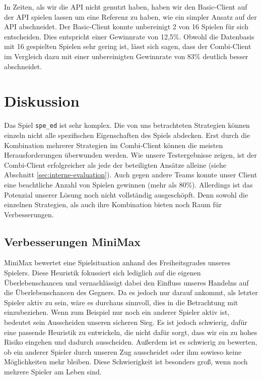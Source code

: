 \documentclass[12pt,a4paper]{article}
\begin{document}
In Zeiten, als wir die API nicht genutzt haben, haben wir den Basic-Client auf der API spielen lassen um eine Referenz zu haben, wie ein simpler Ansatz auf der API abschneidet. Der Basic-Client konnte unbereinigt 2 von 16 Spielen für sich entscheiden. Dies entspricht einer Gewinnrate von 12,5\%. Obwohl die Datenbasis mit 16 gespielten Spielen sehr gering ist, lässt sich sagen, dass der Combi-Client im Vergleich dazu mit einer unbereinigten Gewinnrate von 83\% deutlich besser abschneidet.


\section{Diskussion}
Das Spiel \texttt{spe\_ed} ist sehr komplex. Die von uns betrachteten Strategien können einzeln nicht alle spezifischen Eigenschaften des Spiels abdecken. Erst durch die Kombination mehrerer Strategien im Combi-Client können die meisten Herausforderungen überwunden werden. Wie unsere Testergebnisse zeigen, ist der Combi-Client erfolgreicher als jede der beteiligten Ansätze alleine (siehe Abschnitt \ref{sec:interne-evaluation}). Auch gegen andere Teams konnte unser Client eine beachtliche Anzahl von Spielen gewinnen (mehr als 80\%). Allerdings ist das Potenzial unserer Lösung noch nicht vollständig ausgeschöpft. Denn sowohl die einzelnen Strategien, als auch ihre Kombination bieten noch Raum für Verbesserungen.

\subsection{Verbesserungen MiniMax}
MiniMax bewertet eine Spielsituation anhand des Freiheitsgrades unseres Spielers. Diese Heuristik fokussiert sich lediglich auf die eigenen Überlebenschancen und vernachlässigt dabei den Einfluss unseres Handelns auf die Überlebenschancen des Gegners. Da es jedoch nur darauf ankommt, als letzter Spieler aktiv zu sein, wäre es durchaus sinnvoll, dies in die Betrachtung mit einzubeziehen. Wenn zum Beispiel nur noch ein anderer Spieler aktiv ist, bedeutet sein Ausscheiden unseren sicheren Sieg. Es ist jedoch schwierig, dafür eine passende Heuristik zu entwickeln, die nicht dafür sorgt, dass wir ein zu hohes Risiko eingehen und dadurch ausscheiden. Außerdem ist es schwierig zu bewerten, ob ein anderer Spieler durch unseren Zug ausscheidet oder ihm sowieso keine Möglichkeiten mehr bleiben. Diese Schwierigkeit ist besonders groß, wenn noch mehrere Spieler am Leben sind.
\end{document}
